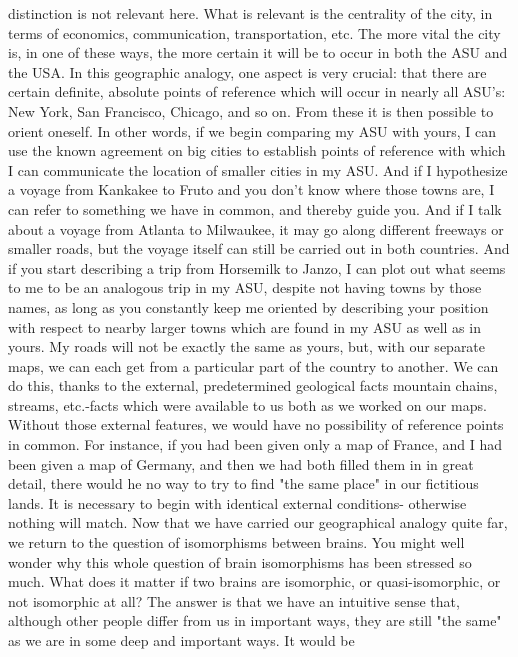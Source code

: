 distinction is not relevant here. What is relevant is the centrality of the city, in terms of
economics, communication, transportation, etc. The more vital the city is, in one of these
ways, the more certain it will be to occur in both the ASU and the USA.
        In this geographic analogy, one aspect is very crucial: that there are certain
definite, absolute points of reference which will occur in nearly all ASU's: New York,
San Francisco, Chicago, and so on. From these it is then possible to orient oneself. In
other words, if we begin comparing my ASU with yours, I can use the known agreement
on big cities to establish points of reference with which I can communicate the location
of smaller cities in my ASU. And if I hypothesize a voyage from Kankakee to Fruto and
you don't know where those towns are, I can refer to something we have in common, and
thereby guide you. And if I talk about a voyage from Atlanta to Milwaukee, it may go
along different freeways or smaller roads, but the voyage itself can still be carried out in
both countries. And if you start describing a trip from Horsemilk to Janzo, I can plot out
what seems to me to be an analogous trip in my ASU, despite not having towns by those
names, as long as you constantly keep me oriented by describing your position with
respect to nearby larger towns which are found in my ASU as well as in yours.
        My roads will not be exactly the same as yours, but, with our separate maps, we
can each get from a particular part of the country to another. We can do this, thanks to the
external, predetermined geological facts mountain chains, streams, etc.-facts which were
available to us both as we worked on our maps. Without those external features, we
would have no possibility of reference points in common. For instance, if you had been
given only a map of France, and I had been given a map of Germany, and then we had
both filled them in in great detail, there would he no way to try to find "the same place"
in our fictitious lands. It is necessary to begin with identical external conditions-
otherwise nothing will match.
        Now that we have carried our geographical analogy quite far, we return to the
question of isomorphisms between brains. You might well wonder why this whole
question of brain isomorphisms has been stressed so much. What does it matter if two
brains are isomorphic, or quasi-isomorphic, or not isomorphic at all? The answer is that
we have an intuitive sense that, although other people differ from us in important ways,
they are still "the same" as we are in some deep and important ways. It would be
